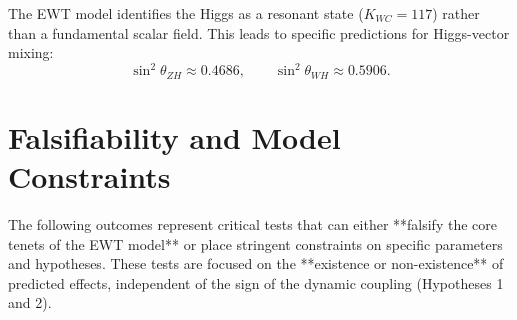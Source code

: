 \documentclass[10pt,a4paper]{article}
\begin{document}
The EWT model identifies the Higgs as a resonant state (\(K_{WC}=117\)) rather than a fundamental scalar field. This leads to specific predictions for Higgs-vector mixing:
\begin{equation}
	\sin^2\theta_{ZH}
	\approx
	0.4686,
	\qquad
	\sin^2\theta_{WH}
	\approx
	0.5906.
\end{equation}


\section{Falsifiability and Model Constraints}
\label{sec:falsifiability_new}

The following outcomes represent critical tests that can either **falsify the core tenets of the EWT model** or place stringent constraints on specific parameters and hypotheses. These tests are focused on the **existence or non-existence** of predicted effects, independent of the sign of the dynamic coupling (Hypotheses 1 and 2).
\end{document}
